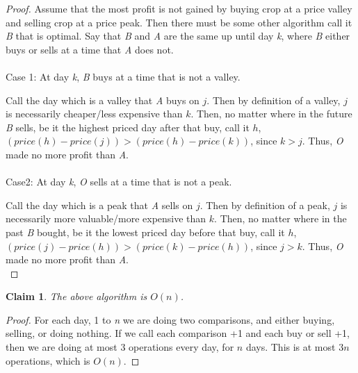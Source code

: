 \documentclass[11pt]{article}
\newtheorem{claim}[theorem]{Claim}
\begin{document}
	\begin{proof}
			Assume that the most profit is not gained by buying crop at a price valley and selling crop at a price peak. Then there must be some other algorithm call it \textit{B} that is optimal. Say that \textit{B} and \textit{A} are the same up until day \textit{k}, where \textit{B} either buys or sells at a time that \textit{A} does not.\\
			\\
			Case 1: At day \textit{k}, \textit{B} buys at a time that is not a valley. 
			
				Call the day which is a valley that \textit{A} buys on $j$. Then by definition of a valley, $j$ is necessarily cheaper/less expensive than $k$. Then, no matter where in the future \textit{B} sells, be it the highest priced day after that buy, call it $h$, $(price(h) - price(j)) > (price(h) - price(k))$, since $k > j$. Thus, \textit{O} made no more profit than \textit{A}. \\
			\\
			Case2: At day \textit{k}, \textit{O} sells at a time that is not a peak.
				
				Call the day which is a peak that \textit{A} sells on $j$. Then by definition of a peak, $j$ is necessarily more valuable/more expensive than $k$. Then, no matter where in the past \textit{B} bought, be it the lowest priced day before that buy, call it $h$, $(price(j) - price(h)) > (price(k) - price(h))$, since $j > k$. Thus, \textit{O} made no more profit than \textit{A}. \\
				
	\end{proof}

	\begin{claim} 
	The above algorithm is $O(n)$. 
\end{claim}

\begin{proof}
	For each day, 1 to \textit{n} we are doing two comparisons, and either buying, selling, or doing nothing. If we call each comparison +1 and each buy or sell +1, then we are doing at most $3$ operations every day, for $n$ days. This is at most $3n$ operations, which is $O(n)$.
\end{proof}

	\newpage
	
	
\end{document}
